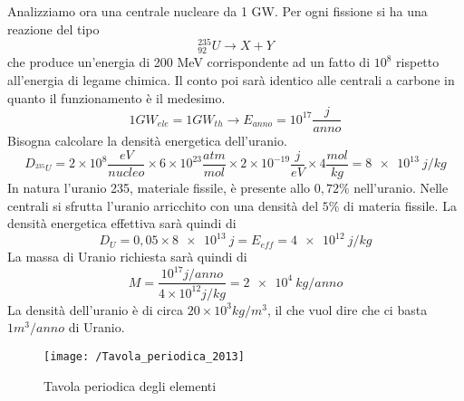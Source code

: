 Analizziamo ora una centrale nucleare da 1 GW.
Per ogni fissione si ha una reazione del tipo
\begin{equation}
_{92}^{235}U\longrightarrow X+Y
\end{equation}
che produce un'energia di 200 MeV corrispondente ad un fatto di $10^8$ rispetto all'energia di legame chimica.
Il conto poi sarà identico alle centrali a carbone in quanto il funzionamento è il medesimo.
\begin{equation}
1GW_{ele}=1GW_{th}\longrightarrow E_{anno}=10^{17}\frac{j}{anno}
\end{equation}
Bisogna calcolare la densità energetica dell'uranio.
\begin{equation}
D_{^{235}U}=2\times10^8\frac{eV}{nucleo}\times 6\times10^{23}\frac{atm}{mol}\times2\times10^{-19}\frac{j}{eV}\times4\frac{mol}{kg}=\SI{8e13}{j/kg}
\end{equation}
In natura l'uranio 235, materiale fissile, è presente allo $0,72\%$ nell'uranio. 
Nelle centrali si sfrutta l'uranio arricchito con una densità del $5\%$ di materia fissile.
La densità energetica effettiva sarà quindi di 
\begin{equation}
D_U=0,05\times\SI{8e13}{j}=E_{eff}=\SI{4e12}{j/kg}
\end{equation}
La massa di Uranio richiesta sarà quindi di 
\begin{equation}
M=\frac{10^{17}j/anno}{4\times10^{12}j/kg}=\SI{2e4}{kg/anno}
\end{equation}
La densità dell'uranio è di circa $20\times10^3 kg/m^3$, il che vuol dire che ci basta $1 m^3/anno$ di Uranio.

\newpage
\begin{figure}[h]
\centering
\texttt{[image: /Tavola\_periodica\_2013]}
\caption{Tavola periodica degli elementi}
\end{figure}
